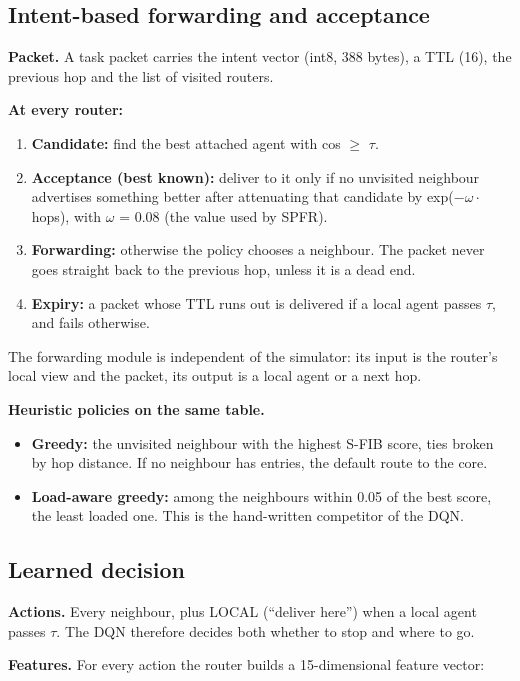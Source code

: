 \documentclass[journal]{IEEEtran}
\begin{document}
\subsection{Intent-based forwarding and acceptance}
\textbf{Packet.} A task packet carries the intent vector (int8, 388 bytes), a TTL (16), the previous hop and the list of visited routers.

\textbf{At every router:}

\begin{enumerate}
\item \textbf{Candidate:} find the best attached agent with cos $\geq$ $\tau$.
\item \textbf{Acceptance (best known):} deliver to it only if no unvisited neighbour advertises something better after attenuating that candidate by exp($-\omega\cdot$hops), with $\omega$ = 0.08 (the value used by SPFR).
\item \textbf{Forwarding:} otherwise the policy chooses a neighbour. The packet never goes straight back to the previous hop, unless it is a dead end.
\item \textbf{Expiry:} a packet whose TTL runs out is delivered if a local agent passes $\tau$, and fails otherwise.
\end{enumerate}

The forwarding module is independent of the simulator: its input is the router's local view and the packet, its output is a local agent or a next hop.

\textbf{Heuristic policies on the same table.}

\begin{itemize}
\item \textbf{Greedy:} the unvisited neighbour with the highest S-FIB score, ties broken by hop distance. If no neighbour has entries, the default route to the core.
\item \textbf{Load-aware greedy:} among the neighbours within 0.05 of the best score, the least loaded one. This is the hand-written competitor of the DQN.
\end{itemize}

\subsection{Learned decision}
\textbf{Actions.} Every neighbour, plus LOCAL (``deliver here'') when a local agent passes $\tau$. The DQN therefore decides both whether to stop and where to go.

\textbf{Features.} For every action the router builds a 15-dimensional feature vector:
\end{document}
